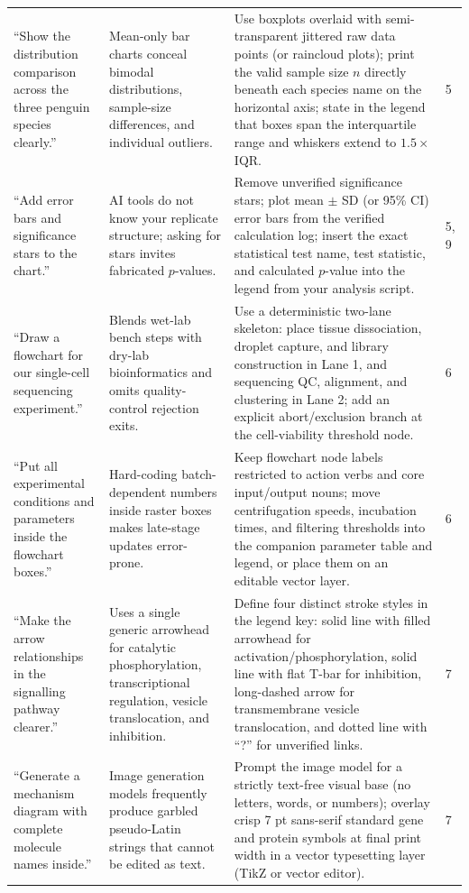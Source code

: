 \begin{longtable}{@{}p{26mm}p{28mm}p{56mm}p{10mm}@{}}
``Show the distribution comparison across the three penguin species clearly.'' & Mean-only bar charts conceal bimodal distributions, sample-size differences, and individual outliers. & Use boxplots overlaid with semi-transparent jittered raw data points (or raincloud plots); print the valid sample size $n$ directly beneath each species name on the horizontal axis; state in the legend that boxes span the interquartile range and whiskers extend to $1.5\times$ IQR. & 5 \\
``Add error bars and significance stars to the chart.'' & AI tools do not know your replicate structure; asking for stars invites fabricated $p$-values. & Remove unverified significance stars; plot mean $\pm$ SD (or 95\% CI) error bars from the verified calculation log; insert the exact statistical test name, test statistic, and calculated $p$-value into the legend from your analysis script. & 5, 9 \\
``Draw a flowchart for our single-cell sequencing experiment.'' & Blends wet-lab bench steps with dry-lab bioinformatics and omits quality-control rejection exits. & Use a deterministic two-lane skeleton: place tissue dissociation, droplet capture, and library construction in Lane 1, and sequencing QC, alignment, and clustering in Lane 2; add an explicit abort/exclusion branch at the cell-viability threshold node. & 6 \\
``Put all experimental conditions and parameters inside the flowchart boxes.'' & Hard-coding batch-dependent numbers inside raster boxes makes late-stage updates error-prone. & Keep flowchart node labels restricted to action verbs and core input/output nouns; move centrifugation speeds, incubation times, and filtering thresholds into the companion parameter table and legend, or place them on an editable vector layer. & 6 \\
``Make the arrow relationships in the signalling pathway clearer.'' & Uses a single generic arrowhead for catalytic phosphorylation, transcriptional regulation, vesicle translocation, and inhibition. & Define four distinct stroke styles in the legend key: solid line with filled arrowhead for activation/phosphorylation, solid line with flat T-bar for inhibition, long-dashed arrow for transmembrane vesicle translocation, and dotted line with ``?'' for unverified links. & 7 \\
``Generate a mechanism diagram with complete molecule names inside.'' & Image generation models frequently produce garbled pseudo-Latin strings that cannot be edited as text. & Prompt the image model for a strictly text-free visual base (no letters, words, or numbers); overlay crisp 7 pt sans-serif standard gene and protein symbols at final print width in a vector typesetting layer (TikZ or vector editor). & 7 \\

\end{longtable}
